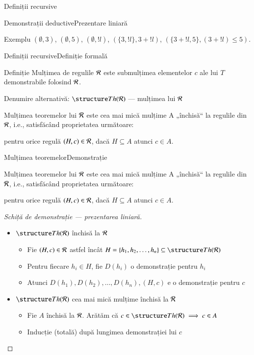 \documentclass[xcolor=pdftex,romanian,colorlinks]{beamer}
\begin{document}
\begin{section}{Definiții recursive}
\begin{frame}{Demonstrații deductive}{Prezentare liniară}
  \begin{block}{Exemplu}
      $(\emptyset, 3)$,
      $(\emptyset, 5)$,
      $(\emptyset, ! l)$,
      $(\{3, !l \}, 3 + ! l)$,
     $(\{3 + ! l, 5\}, (3 + ! l) \leq 5)$.
  \end{block}
\end{frame}

\begin{frame}{Definiții recursive}{Definiție formală}
  \begin{block}{Definiție}
     Mulțimea  de regulile ${\cal R}$ este submulțimea elementelor $c$ ale lui $T$ demonstrabile folosind ${\cal R}$.

 Denumire alternativă: $\Th{\R}$ --- mulțimea  lui ${\cal R}$

  \end{block}

\begin{theorem}
Mulțimea teoremelor lui $\cal R$ este cea mai mică mulțime A „închisă“ la regulile din $\cal R$, i.e.,  satisfăcând proprietatea următoare:
      
\hfill pentru orice regulă $(H,c) \in {\cal R}$, dacă $H\subseteq A$ atunci $c\in A$.\hfill\;
\end{theorem}
\end{frame}

\begin{frame}{Mulțimea teoremelor}{Demonstrație}
\begin{theorem}
Mulțimea teoremelor lui $\cal R$ este cea mai mică mulțime A „închisă“ la regulile din $\cal R$, i.e.,  satisfăcând proprietatea următoare:
      
\hfill pentru orice regulă $(H,c) \in {\cal R}$, dacă $H\subseteq A$ atunci $c\in A$.\hfill\;
\end{theorem}
\begin{proof}[Schiță de demonstrație --- prezentarea liniară]
\begin{itemize}
\item $\Th{\R}$ închisă la ${\cal R}$
\begin{itemize}
\item<2-> Fie $(H,c) \in {\cal R}$ astfel încât $H = \{h_1, h_2, \ldots, h_n\} \subseteq  \Th{\R}$
\item<2-> Pentru fiecare $h_i\in H$, fie $D(h_i)$ o demonstrație pentru $h_i$
\item<2-> Atunci $D(h_1), D(h_2),\ldots,D(h_n), (H,c)$ e o demonstrație pentru $c$
\end{itemize}
\item $\Th\R$ cea mai mică mulțime închisă la ${\cal R}$
\begin{itemize}
\item<3> Fie $A$ închisă la ${\cal R}$. Arătăm că $c\in \Th{\R} \implies c\in A$
\item <3>Inducție (totală) după lungimea demonstrației lui $c$
\end{itemize}
\end{itemize}
\end{proof}
\end{frame}



\end{section}
\end{document}
